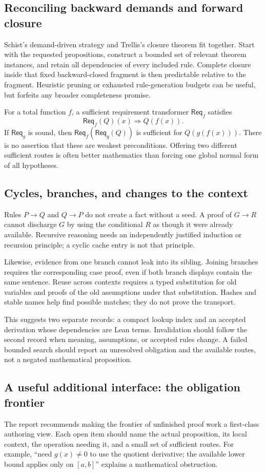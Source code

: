 \documentclass[11pt,letterpaper]{article}
\newcommand{\Req}{\mathsf{Req}}
\theoremstyle{definition}\newtheorem{definition}[proposition]{Definition}
\theoremstyle{remark}\newtheorem{remark}[proposition]{Remark}
\begin{document}
\subsection{Reconciling backward demands and forward closure}
Schist's demand-driven strategy and Trellis's closure theorem fit together.
Start with the requested propositions, construct a bounded set of relevant
theorem instances, and retain all dependencies of every included rule. Complete
closure inside that fixed backward-closed fragment is then predictable relative
to the fragment. Heuristic pruning or exhausted rule-generation budgets can be
useful, but forfeits any broader completeness promise.

For a total function $f$, a sufficient requirement transformer $\Req_f$ satisfies
\[
 \Req_f(Q)(x)\Longrightarrow Q(f(x)).
\]
If $\Req_g$ is sound, then $\Req_f(\Req_g(Q))$ is sufficient for $Q(g(f(x)))$.
There is no assertion that these are weakest preconditions. Offering two
different sufficient routes is often better mathematics than forcing one
global normal form of all hypotheses.

\subsection{Cycles, branches, and changes to the context}
Rules $P\to Q$ and $Q\to P$ do not create a fact without a seed. A proof of
$G\to R$ cannot discharge $G$ by using the conditional $R$ as though it were
already available. Recursive reasoning needs an independently justified
induction or recursion principle; a cyclic cache entry is not that principle.

Likewise, evidence from one branch cannot leak into its sibling. Joining
branches requires the corresponding case proof, even if both branch displays
contain the same sentence. Reuse across contexts requires a typed substitution
for old variables and proofs of the old assumptions under that substitution.
Hashes and stable names help find possible matches; they do not prove the
transport.

This suggests two separate records: a compact lookup index and an accepted
derivation whose dependencies are Lean terms. Invalidation should follow the
second record when meaning, assumptions, or accepted rules change. A failed
bounded search should report an unresolved obligation and the available routes,
not a negated mathematical proposition.

\subsection{A useful additional interface: the obligation frontier}
The report recommends making the frontier of unfinished proof work a first-class
authoring view. Each open item should name the actual proposition, its local
context, the operation needing it, and a small set of sufficient routes. For
example, ``need $g(x)\ne0$ to use the quotient derivative; the available lower
bound applies only on $[a,b]$'' explains a mathematical obstruction.
\end{document}
